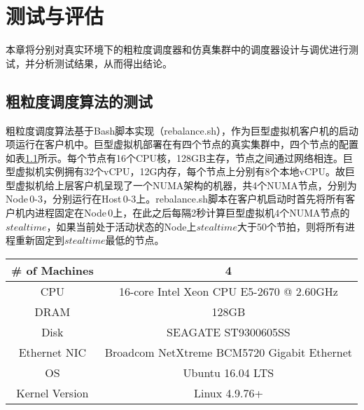 
\chapter{测试与评估}
本章将分别对真实环境下的粗粒度调度器和仿真集群中的调度器设计与调优进行测试，并分析测试结果，从而得出结论。

\section{粗粒度调度算法的测试}
粗粒度调度算法基于Bash脚本实现（rebalance.sh），作为巨型虚拟机客户机的启动项运行在客户机中。巨型虚拟机部署在有四个节点的真实集群中，四个节点的配置如表\ref{tab:config}所示。每个节点有16个CPU核，128GB主存，节点之间通过网络相连。巨型虚拟机实例拥有32个vCPU，12G内存，每个节点上分别有8个本地vCPU。故巨型虚拟机给上层客户机呈现了一个NUMA架构的机器，共4个NUMA节点，分别为Node\,0-3，分别运行在Host\,0-3上。rebalance.sh脚本在客户机启动时首先将所有客户机内进程固定在Node\,0上，在此之后每隔2秒计算巨型虚拟机4个NUMA节点的$steal time$，如果当前处于活动状态的Node上$steal time$大于50个节拍，则将所有进程重新固定到$steal time$最低的节点。

\begin{table}[!htpb]
  \label{tab:config}
  \centering
  \begin{threeparttable}[b]
     \begin{tabular}{c|c}
      \toprule
      \# of Machines & 4  \\
      \hline
      CPU & 16-core Intel Xeon CPU E5-2670 @ 2.60GHz  \\
      \hline
      DRAM & 128GB \\
      \hline
      Disk & SEAGATE ST9300605SS \\
      \hline
      Ethernet NIC & Broadcom NetXtreme BCM5720 Gigabit Ethernet \\
      \hline
      OS & Ubuntu 16.04 LTS \\
      \hline
      Kernel Version & Linux 4.9.76+ \\
      \bottomrule
    \end{tabular}
  \end{threeparttable}
\end{table}

